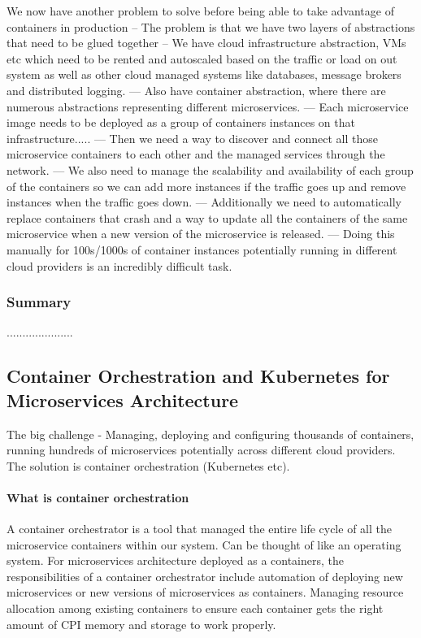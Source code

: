\documentclass[a4paper, 11pt]{book}
\begin{document}
{    We now have another problem to solve before being able to take advantage of containers in production
    -- The problem is that we have two layers of abstractions that need to be glued together
    -- We have cloud infrastructure abstraction, VMs etc which need to be rented and autoscaled based on the traffic or load on out system as well as other cloud managed systems like databases, message brokers and distributed logging.
    --- Also have container abstraction, where there are numerous abstractions representing different microservices.
    --- Each microservice image needs to be deployed as a group of containers instances on that infrastructure.....
    --- Then we need a way to discover and connect all those microservice containers to each other and the managed services through the network.
    --- We also need to manage the scalability and availability of each group of the containers so we can add more instances if the traffic goes up and remove instances when the traffic goes down.
    --- Additionally we need to automatically replace containers that crash and a way to update all the containers of the same microservice when a new version of the microservice is released.
    --- Doing this manually for 100s/1000s of container instances potentially running in different cloud providers is an incredibly difficult task.

    \subsubsection{Summary}
    .....................

    \subsection{Container Orchestration and Kubernetes for Microservices Architecture}
    The big challenge - Managing, deploying and configuring thousands of containers, running hundreds of microservices potentially across different cloud providers.
    The solution is container orchestration (Kubernetes etc).

    \paragraph{What is container orchestration}
    A container orchestrator is a tool that managed the entire life cycle of all the microservice containers within our system.
    Can be thought of like an operating system.
    For microservices architecture deployed as a containers, the responsibilities of a container orchestrator include automation of deploying new microservices or new versions of microservices as containers.
    Managing resource allocation among existing containers to ensure each container gets the right amount of CPI memory and storage to work properly.

}
\end{document}
